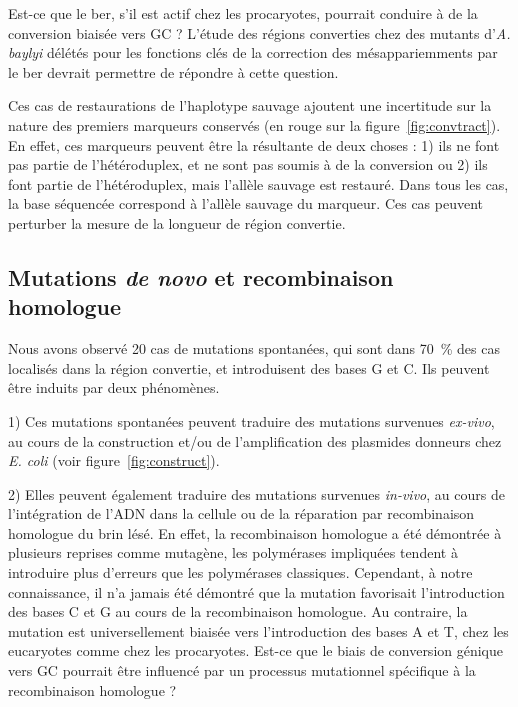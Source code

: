 Est-ce que le \ac{ber}, s'il est actif chez les procaryotes, pourrait conduire à
de la conversion biaisée vers GC ? L'étude des régions converties chez des
mutants d'\emph{A. baylyi} délétés pour les fonctions clés de la correction des
mésappariemments par le \ac{ber} devrait permettre de répondre à cette question.

Ces cas de restaurations de l'haplotype sauvage ajoutent une incertitude sur la
nature des premiers marqueurs conservés (en rouge sur la
figure~\ref{fig:convtract}). En effet, ces marqueurs peuvent être la résultante
de deux choses : 1) ils ne font pas partie de l'hétéroduplex, et ne sont pas
soumis à de la conversion ou 2) ils font partie de l'hétéroduplex, mais l'allèle
sauvage est restauré. Dans tous les cas, la base séquencée correspond à l'allèle
sauvage du marqueur. Ces cas peuvent perturber la mesure de la longueur de
région convertie.

\subsection{Mutations \emph{de novo} et recombinaison homologue}
\label{subsec:discu-neomut}
\afterpage{\blankpage}

Nous avons observé 20 cas de mutations spontanées, qui sont dans
\SI{70}{\percent} des cas localisés dans la région convertie, et introduisent
des bases G et C. Ils peuvent être induits par deux phénomènes.

1) Ces mutations spontanées peuvent traduire des mutations survenues
\emph{ex-vivo}, au cours de la construction et/ou de l'amplification des
plasmides donneurs chez \emph{E. coli} (voir figure~\ref{fig:construct}).

2) Elles peuvent également traduire des mutations survenues \emph{in-vivo}, au
cours de l'intégration de l'ADN dans la cellule ou de la réparation par
recombinaison homologue du brin lésé. En effet, la recombinaison homologue a été
démontrée à plusieurs reprises comme
mutagène\cite{hicks_increased_2010,arbeithuber_crossovers_2015,malkova_mutations_2012},
les polymérases impliquées tendent à introduire plus d'erreurs que les
polymérases classiques\cite{pomerantz_dna_2013}. Cependant, à notre
connaissance, il n'a jamais été démontré que la mutation favorisait
l'introduction des bases C et G au cours de la recombinaison homologue. Au
contraire, la mutation est universellement biaisée vers l'introduction des bases
A et T, chez les eucaryotes\cite{lynch_rate_2010} comme chez les
procaryotes\cite{hildebrand_evidence_2010,hershberg_evidence_2010}. Est-ce que
le biais de conversion génique vers GC pourrait être influencé par un processus
mutationnel spécifique à la recombinaison homologue ?


